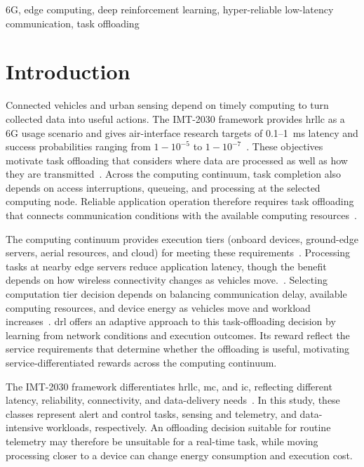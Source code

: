 \documentclass[journal]{IEEEtran}
\begin{document}
\begin{IEEEkeywords}
6G, edge computing, deep reinforcement learning, hyper-reliable low-latency communication, task offloading
\end{IEEEkeywords}

\acresetall

\IEEEpeerreviewmaketitle


\section{Introduction}
\label{sec:introduction}

Connected vehicles and urban sensing depend on timely computing to turn collected data into useful actions. The IMT-2030 framework provides \ac{hrllc} as a 6G usage scenario and gives air-interface research targets of 0.1--1~ms latency and success probabilities ranging from \(1-10^{-5}\) to \(1-10^{-7}\)~\cite{ITU_M2160}.
%
These objectives motivate task offloading that considers where data are processed as well as how they are transmitted~\cite{Liu2017LatencyReliability}.
Across the computing continuum, task completion also depends on access interruptions, queueing, and processing at the selected computing node.
Reliable application operation therefore requires task offloading that connects communication conditions with the available computing resources~\cite{ETSI_MEC002_2025}.

The computing continuum provides execution tiers (onboard devices, ground-edge servers, aerial resources, and  cloud) for meeting these requirements~\cite{Dai2024UAVAssisted}.
Processing tasks at nearby edge servers reduce application latency, though the benefit depends on how wireless connectivity changes as vehicles move.~\cite{ETSI_MEC002_2025}.
Selecting computation tier decision depends on balancing communication delay, available computing resources, and device energy as vehicles move and workload increases~\cite{RW05,RW08,Batewela2020RiskSensitive}.
\Ac{drl} offers an adaptive approach to this task-offloading decision by learning from network conditions and execution outcomes. Its reward reflect the service requirements that determine whether the offloading is useful, motivating service-differentiated rewards across the computing continuum.

The IMT-2030 framework differentiates \ac{hrllc}, \ac{mc}, and \ac{ic}, reflecting different latency, reliability, connectivity, and data-delivery needs~\cite{ITU_M2160}.
In this study, these classes represent alert and control tasks, sensing and telemetry, and data-intensive workloads, respectively.
An offloading decision suitable for routine telemetry may therefore be unsuitable for a real-time task, while moving processing closer to a device can change energy consumption and execution cost. %
\end{document}

